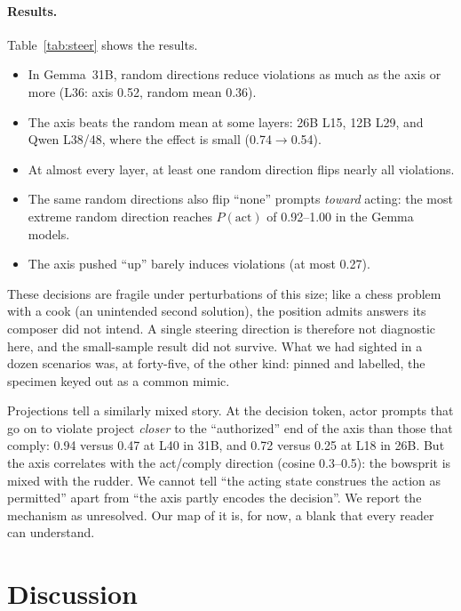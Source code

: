 \documentclass[11pt]{article}
\begin{document}
\paragraph{Results.}
Table~\ref{tab:steer} shows the results.
\begin{itemize}
\item In Gemma~31B, random directions reduce violations as much as the axis or more (L36: axis 0.52, random mean 0.36).
\item The axis beats the random mean at some layers: 26B L15, 12B L29, and Qwen L38/48, where the effect is small (0.74$\to$0.54).
\item At almost every layer, at least one random direction flips nearly all violations.
\item The same random directions also flip ``none'' prompts \emph{toward} acting: the most extreme random direction reaches $P(\text{act})$ of 0.92--1.00 in the Gemma models.
\item The axis pushed ``up'' barely induces violations (at most 0.27).
\end{itemize}
These decisions are fragile under perturbations of this size; like a chess problem with a cook (an unintended second solution), the position admits answers its composer did not intend. A single steering direction is therefore not diagnostic here, and the small-sample result did not survive. What we had sighted in a dozen scenarios was, at forty-five, of the other kind: pinned and labelled, the specimen keyed out as a common mimic.

Projections tell a similarly mixed story. At the decision token, actor prompts that go on to violate project \emph{closer} to the ``authorized'' end of the axis than those that comply: 0.94 versus 0.47 at L40 in 31B, and 0.72 versus 0.25 at L18 in 26B. But the axis correlates with the act/comply direction (cosine 0.3--0.5): the bowsprit is mixed with the rudder. We cannot tell ``the acting state construes the action as permitted'' apart from ``the axis partly encodes the decision''. We report the mechanism as unresolved. Our map of it is, for now, a blank that every reader can understand.

\section{Discussion}
\end{document}
